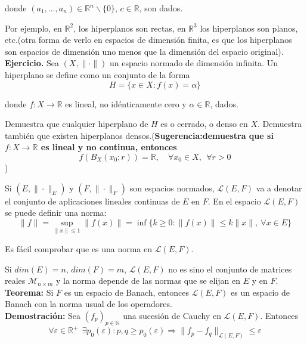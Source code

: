 \documentclass{article}
\begin{document}
donde $(a_1,\ldots,a_n)\in \mathbb{R}^n\backslash \{0\}$, $c\in\mathbb{R}$, son dados.

Por ejemplo, en $\mathbb{R}^2$, los hiperplanos son rectas, en $\mathbb{R}^3$ los hiperplanos son planos, etc.(otra forma de verlo en espacios de dimensión finita, es que los hiperplanos son espacios de dimensión uno menos que la dimensión del espacio original).\\

\textbf{Ejercicio.} Sea $(X,\|\cdot\|)$ un espacio normado de dimensión infinita. Un hiperplano se define como un conjunto de la forma
\begin{equation*}
H=\{x\in X:f(x)=\alpha\}
\end{equation*}

donde $f:X\rightarrow \mathbb{R}$ es lineal, no idénticamente cero y $\alpha\in\mathbb{R}$, dados.

Demuestra que cualquier hiperplano de $H$ es o cerrado, o denso en $X$. Demuestra también que existen hiperplanos densos.(\textbf{Sugerencia:demuestra que si $f:X\rightarrow \mathbb{R}$ es lineal y no continua, entonces 
\begin{equation*}
f(B_X(x_0;r))=\mathbb{R},\quad \forall x_0\in X,\:\:\forall r>0
\end{equation*}})

Si $(E,\|\cdot\|_E)$ y $(F,\|\cdot\|_F)$ son espacios normados, $\mathcal{L}(E,F)$ va a denotar el conjunto de aplicaciones lineales continuas de $E$ en $F$. En el espacio $\mathcal{L}(E,F)$ se puede definir una norma:
\begin{equation*}
\|f\|=\sup_{\|x\|\leq 1}\|f(x)\|=\inf\{k\geq 0:\|f(x)\|\leq k\|x\|,\:\forall x\in E\}
\end{equation*}

Es fácil comprobar que es una norma en $\mathcal{L}(E,F)$. 

Si $dim(E)=n$, $dim(F)=m$, $\mathcal{L}(E,F)$ no es sino el conjunto de matrices reales $\mathcal{M}_{n\times m}$ y la norma depende de las normas que se elijan en $E$ y en $F$.\\

\textbf{Teorema:} Si $F$ es un espacio de Banach, entonces $\mathcal{L}(E,F)$ es un espacio de Banach con la norma usual de los operadores.\\

\textbf{Demostración:} Sea $(f_p)_{p\in\mathbb{N}}$ una sucesión de Cauchy en $\mathcal{L}(E,F)$. Entonces
\begin{equation*}
\forall \varepsilon \in \mathbb{R}^+\:\:\exists p_0(\varepsilon):p,q\geq p_0(\varepsilon)\Rightarrow \|f_p-f_q\|_{\mathcal{L}(E,F)}\leq \varepsilon
\end{equation*}
\end{document}
